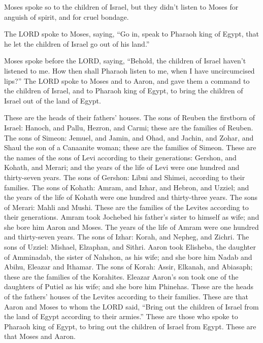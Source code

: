  Moses spoke so to the children of Israel, but they didn't
listen to Moses for anguish of spirit, and for cruel bondage.

 The LORD spoke to Moses, saying,  ``Go
in, speak to Pharaoh king of Egypt, that he let the children of Israel
go out of his land.''

 Moses spoke before the LORD, saying, ``Behold, the
children of Israel haven't listened to me. How then shall Pharaoh listen
to me, when I have uncircumcised lips?''  The LORD spoke
to Moses and to Aaron, and gave them a command to the children of
Israel, and to Pharaoh king of Egypt, to bring the children of Israel
out of the land of Egypt.

 These are the heads of their fathers' houses. The sons
of Reuben the firstborn of Israel: Hanoch, and Pallu, Hezron, and Carmi;
these are the families of Reuben.  The sons of Simeon:
Jemuel, and Jamin, and Ohad, and Jachin, and Zohar, and Shaul the son of
a Canaanite woman; these are the families of Simeon. 
These are the names of the sons of Levi according to their generations:
Gershon, and Kohath, and Merari; and the years of the life of Levi were
one hundred and thirty-seven years.  The sons of Gershon:
Libni and Shimei, according to their families.  The sons
of Kohath: Amram, and Izhar, and Hebron, and Uzziel; and the years of
the life of Kohath were one hundred and thirty-three years.
 The sons of Merari: Mahli and Mushi. These are the
families of the Levites according to their generations. 
Amram took Jochebed his father's sister to himself as wife; and she bore
him Aaron and Moses. The years of the life of Amram were one hundred and
thirty-seven years.  The sons of Izhar: Korah, and
Nepheg, and Zichri.  The sons of Uzziel: Mishael,
Elzaphan, and Sithri.  Aaron took Elisheba, the daughter
of Amminadab, the sister of Nahshon, as his wife; and she bore him Nadab
and Abihu, Eleazar and Ithamar.  The sons of Korah:
Assir, Elkanah, and Abiasaph; these are the families of the Korahites.
 Eleazar Aaron's son took one of the daughters of Putiel
as his wife; and she bore him Phinehas. These are the heads of the
fathers' houses of the Levites according to their families.
 These are that Aaron and Moses to whom the LORD said,
``Bring out the children of Israel from the land of Egypt according to
their armies.''  These are those who spoke to Pharaoh
king of Egypt, to bring out the children of Israel from Egypt. These are
that Moses and Aaron.

